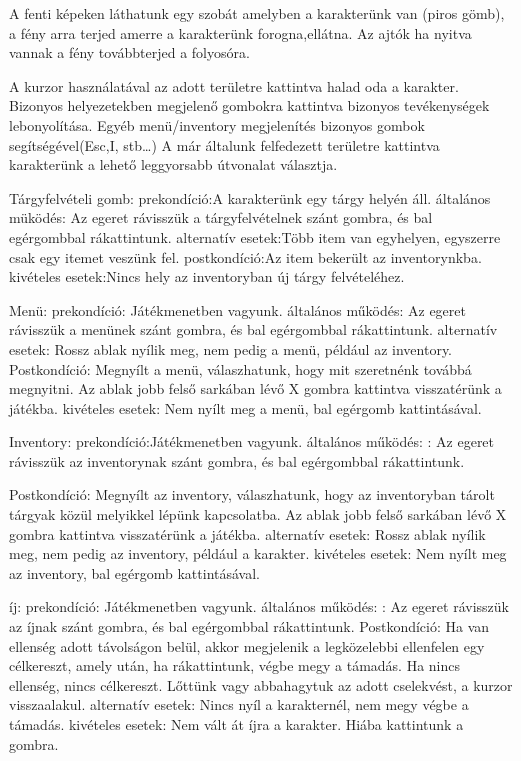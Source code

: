 A fenti képeken láthatunk egy szobát amelyben a karakterünk van (piros gömb), a fény arra terjed amerre a karakterünk forogna,ellátna.
Az ajtók ha nyitva vannak a fény továbbterjed a folyosóra.


A kurzor használatával az adott területre kattintva halad oda a karakter.
Bizonyos helyezetekben megjelenő gombokra kattintva bizonyos tevékenységek lebonyolítása.
Egyéb menü/inventory megjelenítés bizonyos gombok segítségével(Esc,I, stb…)
A már általunk felfedezett területre kattintva karakterünk a lehető leggyorsabb útvonalat választja.


Tárgyfelvételi gomb:
prekondíció:A karakterünk egy tárgy helyén áll.
általános müködés: Az egeret rávisszük a tárgyfelvételnek szánt gombra, és bal egérgombbal rákattintunk.
alternatív esetek:Több item van egyhelyen, egyszerre csak egy itemet veszünk fel.
postkondíció:Az item bekerült az inventorynkba.
kivételes esetek:Nincs hely az inventoryban új tárgy felvételéhez.

Menü:
prekondíció: Játékmenetben vagyunk.
általános működés: Az egeret rávisszük a menünek szánt gombra, és bal egérgombbal rákattintunk.
alternatív esetek: Rossz ablak nyílik meg, nem pedig a menü, például az inventory.
Postkondíció: Megnyílt a menü, válaszhatunk, hogy mit szeretnénk továbbá megnyitni. Az ablak jobb felső sarkában lévő X gombra kattintva visszatérünk a játékba.
kivételes esetek: Nem nyílt meg a menü, bal egérgomb kattintásával.

Inventory:
prekondíció:Játékmenetben vagyunk.
általános működés: : Az egeret rávisszük az inventorynak szánt gombra, és bal egérgombbal rákattintunk.

Postkondíció: Megnyílt az inventory, válaszhatunk, hogy az inventoryban tárolt tárgyak közül melyikkel lépünk kapcsolatba. Az ablak jobb felső sarkában lévő X gombra kattintva visszatérünk a játékba.
alternatív esetek: Rossz ablak nyílik meg, nem pedig az inventory, például a karakter.
kivételes esetek: Nem nyílt meg az inventory, bal egérgomb kattintásával.

íj:
prekondíció: Játékmenetben vagyunk.
általános működés: : Az egeret rávisszük az íjnak szánt gombra, és bal egérgombbal rákattintunk.
Postkondíció: Ha van ellenség adott távolságon belül, akkor megjelenik a legközelebbi ellenfelen egy célkereszt, amely után, ha rákattintunk, végbe megy a támadás. Ha nincs ellenség, nincs célkereszt.
Lőttünk vagy abbahagytuk az adott cselekvést, a kurzor visszaalakul.
alternatív esetek: Nincs nyíl a karakternél, nem megy végbe a támadás.
kivételes esetek: Nem vált át íjra a karakter. Hiába kattintunk a gombra.

